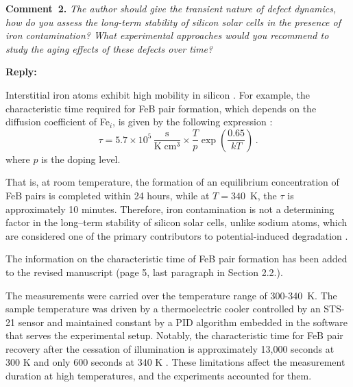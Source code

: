 \documentclass[a4paper,fleqn]{cas-sc}
\begin{document}
\vspace{1cm}
\noindent
\textcolor[rgb]{0.00,0.50,1.00}{\textbf{Comment~2.}}
\emph{ The author should give the transient nature of defect dynamics, how do you assess the long-term stability of silicon solar cells in the presence of iron contamination? What experimental approaches would you recommend to study the aging effects of these defects over time?}


\noindent
\textcolor[rgb]{0.51,0.00,0.00}{\textbf{Reply:}}

Interstitial iron atoms exhibit high mobility in silicon \cite{Istratov1999}. 
For example, the characteristic time required for FeB pair formation, 
which depends on the diffusion coefficient of Fe$_i$, is given by the following expression \cite{FeBAssJAP2014,FeBKin2019,FeBAssSST2011}:
\begin{equation}
\label{eqTass}
\tau=5.7\times10^5\,\frac{\mathrm{s}}{\mathrm{K}\;\mathrm{cm}^3}\times\frac{T}{p}\exp\left(\frac{0.65}{kT}\right)\,.
\end{equation}
where
$p$ is the doping level.

That is, at room temperature, the formation of an equilibrium concentration of FeB pairs is completed within 24 hours, 
while at $T=340$~K, the $\tau$ is approximately 10 minutes. 
Therefore, iron contamination is not a determining factor in the long--term stability of silicon solar cells, unlike sodium atoms, which are considered one of the primary contributors to potential-induced degradation \cite{Yamaguchi2021}.


The information on the characteristic time of FeB pair formation has been added to the revised manuscript (page 5, last paragraph in Section 2.2.).

\begin{mdframed}
The measurements were carried over the temperature range of 300-340~K.
The sample temperature was driven by a thermoelectric cooler controlled by an STS-21 sensor
and maintained constant by a PID algorithm embedded in the software that serves the experimental setup.
\textcolor[rgb]{1.00,0.07,0.00}{Notably, the characteristic time for FeB pair recovery after the cessation of illumination is approximately 13,000 seconds at 300 K and only 600 seconds at 340 K \cite{FeBAssJAP2014,FeBKin2019}.
These limitations affect the measurement duration at high temperatures, and the experiments accounted for them.}
\end{mdframed}
\end{document}
